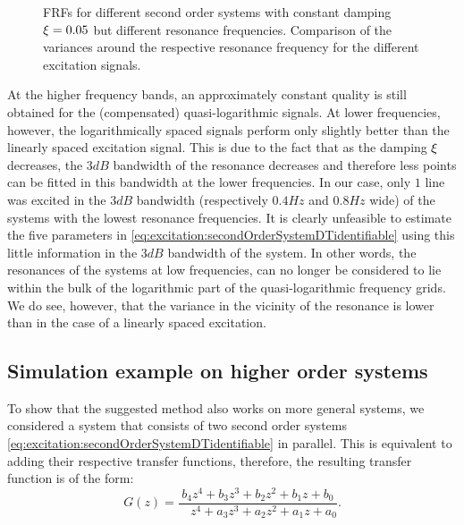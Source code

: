   \begin{figure}%
    \centering
      \setlength{}
      \setlength\figureheight{0.68\figurewidth}
    
    \caption[Simulated FRFs and their variances of systems with $\damping=0.05$ for different excitation signals.]{FRFs for different second order systems with constant damping
             $\damping=0.05$ but different resonance frequencies. Comparison of the
             variances around the respective resonance frequency for the different
             excitation signals.}%
    \label{fig:damping005}
  \end{figure}

  At the higher frequency bands, an approximately constant quality is still obtained for the (compensated) quasi-logarithmic signals.
  At lower frequencies, however, the logarithmically spaced signals perform only slightly better than the linearly spaced excitation signal.
  This is due to the fact that as the damping $\xi$ decreases, the $3\unit{dB}$ bandwidth of the resonance decreases and therefore less points can be fitted in this bandwidth at the lower frequencies.
  In our case, only $1$ line was excited in the $3 \unit{dB}$ bandwidth (respectively $0.4 \unit{Hz}$ and $0.8\unit{Hz}$ wide) of the systems with the lowest resonance frequencies.
  It is clearly unfeasible to estimate the five parameters in
  \eqref{eq:excitation:secondOrderSystemDTidentifiable} using this little information in the $3\unit{dB}$ bandwidth of the system.
  In other words, the resonances of the systems at low frequencies, can no longer be considered to lie within the bulk of the logarithmic part of the quasi-logarithmic frequency grids.
  We do see, however, that the variance in the vicinity of the resonance is lower than in the case of a linearly spaced excitation.

  \subsection{Simulation example on higher order systems}
To show that the suggested method also works on more general systems, we considered a system that consists of two second order systems \eqref{eq:excitation:secondOrderSystemDTidentifiable} in parallel. This is equivalent to adding their respective transfer functions, therefore, the resulting transfer function is of the form:
\begin{equation}
  G \left( z \right) 
  = \frac{         b_4 z^{4} + b_3 z^{3} + b_2 z^{2} + b_1 z + b_0}%
         {\phantom{a_4}z^{4} + a_3 z^{3} + a_2 z^{2} + a_1 z + a_0}
  \text{.}
\label{eq:tfO4}
\end{equation}

